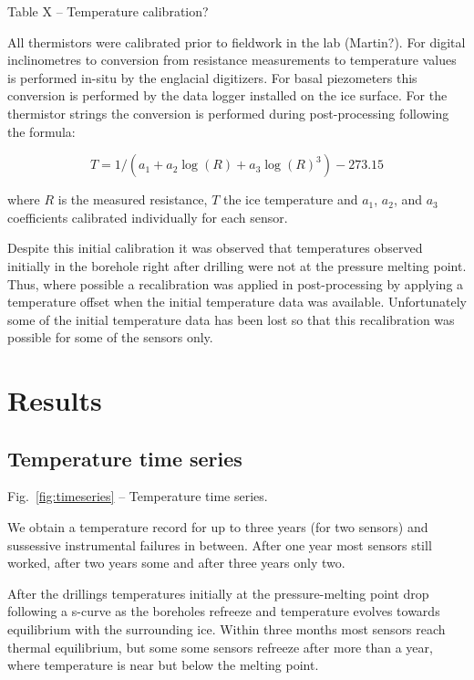 \documentclass[utf8]{article}
\begin{document}
    Table X -- Temperature calibration?

    All thermistors were calibrated prior to fieldwork in the lab (Martin?).
    For digital inclinometres to conversion from resistance measurements to
    temperature values is performed in-situ by the englacial digitizers. For
    basal piezometers this conversion is performed by the data logger installed
    on the ice surface. For the thermistor strings the conversion is performed
    during post-processing following the formula:

    \begin{equation}
      T = 1 / (a_1 + a_2 \log(R) + a_3 \log(R)^3) - 273.15
    \end{equation}

    where $R$ is the measured resistance, $T$ the ice temperature and $a_1$,
    $a_2$, and $a_3$ coefficients calibrated individually for each sensor.

    Despite this initial calibration it was observed that temperatures
    observed initially in the borehole right after drilling were not at the
    pressure melting point. Thus, where possible a recalibration was applied in
    post-processing by applying a temperature offset when the initial
    temperature data was available. Unfortunately some of the initial
    temperature data has been lost so that this recalibration was possible for
    some of the sensors only.


\section{Results}

\subsection{Temperature time series}

    Fig.~\ref{fig:timeseries} -- Temperature time series.

    We obtain a temperature record for up to three years (for two sensors) and
    sussessive instrumental failures in between. After one year most sensors
    still worked, after two years some and after three years only two.

    After the drillings temperatures initially at the pressure-melting point
    drop following a s-curve as the boreholes refreeze and temperature evolves
    towards equilibrium with the surrounding ice. Within three months most
    sensors reach thermal equilibrium, but some some sensors refreeze after
    more than a year, where temperature is near but below the melting point.
\end{document}

